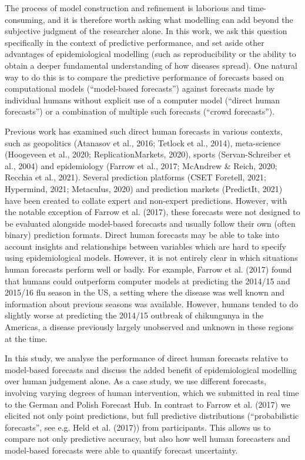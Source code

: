 \documentclass[
]{article}
\begin{document}
The process of model construction and refinement is laborious and time-consuming, and it is therefore worth asking what modelling can add beyond the subjective judgment of the researcher alone. In this work, we ask this question specifically in the context of predictive performance, and set aside other advantages of epidemiological modelling (such as reproducibility or the ability to obtain a deeper fundamental understanding of how diseases spread). One natural way to do this is to compare the predictive performance of forecasts based on computational models (``model-based forecasts'') against forecasts made by individual humans without explicit use of a computer model (``direct human forecasts'') or a combination of multiple such forecasts (``crowd forecasts'').

Previous work has examined such direct human forecasts in various contexts, such as geopolitics (Atanasov et al., 2016; Tetlock et al., 2014), meta-science (Hoogeveen et al., 2020; ReplicationMarkets, 2020), sports (Servan-Schreiber et al., 2004) and epidemiology (Farrow et al., 2017; McAndrew \& Reich, 2020; Recchia et al., 2021). Several prediction platforms (CSET Foretell, 2021; Hypermind, 2021; Metaculus, 2020) and prediction markets (PredictIt, 2021) have been created to collate expert and non-expert predictions. However, with the notable exception of Farrow et al. (2017), these forecasts were not designed to be evaluated alongside model-based forecasts and usually follow their own (often binary) prediction formats. Direct human forecasts may be able to take into account insights and relationships between variables which are hard to specify using epidemiological models. However, it is not entirely clear in which situations human forecasts perform well or badly. For example, Farrow et al. (2017) found that humans could outperform computer models at predicting the 2014/15 and 2015/16 flu season in the US, a setting where the disease was well known and information about previous seasons was available. However, humans tended to do slightly worse at predicting the 2014/15 outbreak of chikungunya in the Americas, a disease previously largely unobserved and unknown in these regions at the time.

In this study, we analyse the performance of direct human forecasts relative to model-based forecasts and discuss the added benefit of epidemiological modelling over human judgement alone. As a case study, we use different forecasts, involving varying degrees of human intervention, which we submitted in real time to the German and Polish Forecast Hub. In contrast to Farrow et al. (2017) we elicited not only point predictions, but full predictive distributions (``probabilistic forecasts'', see e.g. Held et al. (2017)) from participants. This allows us to compare not only predictive accuracy, but also how well human forecasters and model-based forecasts were able to quantify forecast uncertainty.
\end{document}
